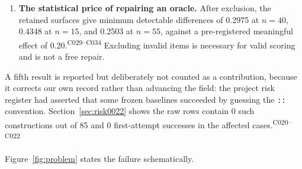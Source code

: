 \documentclass[11pt]{article}
\newcommand{\ledger}[1]{\textsuperscript{\textsf{\scriptsize #1}}}
\begin{document}
\begin{enumerate}
  \item \textbf{The statistical price of repairing an oracle.} After
  exclusion, the retained surfaces give minimum detectable differences of
  0.2975 at $n=40$, 0.4348 at $n=15$, and 0.2503 at $n=55$, against a
  pre-registered meaningful effect of 0.20.\ledger{C029--C034} Excluding
  invalid items is necessary for valid scoring and is not a free repair.
\end{enumerate}

A fifth result is reported but deliberately not counted as a contribution,
because it corrects our own record rather than advancing the field: the
project risk register had asserted that some frozen baselines succeeded by
guessing the \texttt{::} convention. Section~\ref{sec:risk0022} shows the raw
rows contain 0 such constructions out of 85 and 0 first-attempt successes in
the affected cases.\ledger{C020--C022}

Figure~\ref{fig:problem} states the failure schematically.
\end{document}

